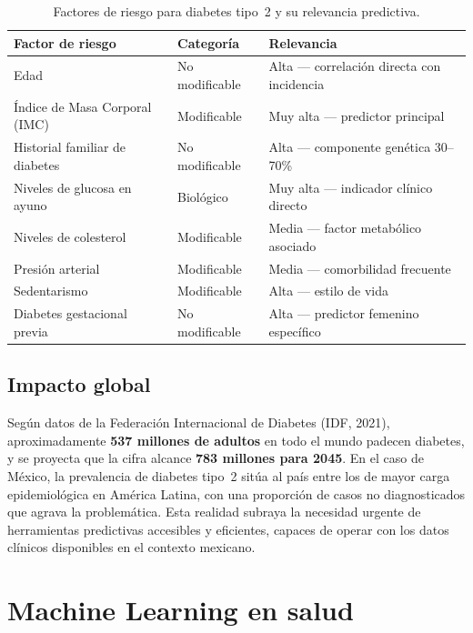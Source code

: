 \documentclass[12pt, letterpaper, twoside]{report}
\newcommand{\thead}[1]{\textbf{\sffamily #1}}
\newcommand{\trow}{}
\begin{document}
\begin{table}[H]
  \centering
  \caption{Factores de riesgo para diabetes tipo~2 y su relevancia predictiva.}
  \label{tab:factores_riesgo}
  \begin{tabularx}{\linewidth}{X l X}
    \toprule
    \thead{Factor de riesgo} & \thead{Categoría} & \thead{Relevancia} \\
    \midrule
    \trow Edad & No modificable & Alta — correlación directa con incidencia \\
    Índice de Masa Corporal (IMC) & Modificable & Muy alta — predictor principal \\
    \trow Historial familiar de diabetes & No modificable & Alta — componente genética 30--70\% \\
    Niveles de glucosa en ayuno & Biológico & Muy alta — indicador clínico directo \\
    \trow Niveles de colesterol & Modificable & Media — factor metabólico asociado \\
    Presión arterial & Modificable & Media — comorbilidad frecuente \\
    \trow Sedentarismo & Modificable & Alta — estilo de vida \\
    Diabetes gestacional previa & No modificable & Alta — predictor femenino específico \\
    \bottomrule
  \end{tabularx}
\end{table}

\subsection{Impacto global}

Según datos de la Federación Internacional de Diabetes (IDF, 2021), aproximadamente \textbf{537 millones de adultos} en todo el mundo padecen diabetes, y se proyecta que la cifra alcance \textbf{783 millones para 2045}. En el caso de México, la prevalencia de diabetes tipo~2 sitúa al país entre los de mayor carga epidemiológica en América Latina, con una proporción de casos no diagnosticados que agrava la problemática. Esta realidad subraya la necesidad urgente de herramientas predictivas accesibles y eficientes, capaces de operar con los datos clínicos disponibles en el contexto mexicano.

\section{Machine Learning en salud}
\end{document}
